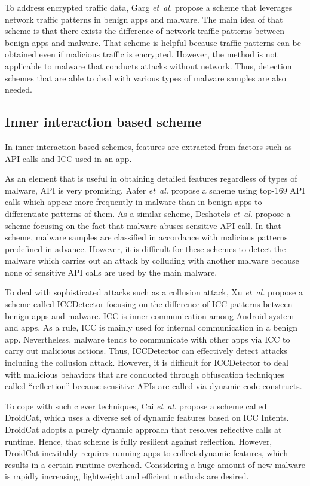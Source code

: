 \documentclass{ieeeaccess}
\newcommand{\etal}{\textit{et~al.}}
\begin{document}
To address encrypted traffic data, Garg \etal \cite{garg2017network} propose a scheme that leverages network traffic patterns in benign apps and malware.
The main idea of that scheme is that there exists the difference of network traffic patterns between benign apps and malware. 
That scheme is helpful because traffic patterns can be obtained even if malicious traffic is encrypted.
However, the method is not applicable to malware that conducts attacks without network.
Thus, detection schemes that are able to deal with various types of malware samples are also needed.

\subsection{Inner interaction based scheme}
In inner interaction based schemes, features are extracted from factors such as API calls and ICC used in an app.

As an element that is useful in obtaining detailed features regardless of types of malware, API is very promising.
Aafer \etal \cite{aafer2013droidapiminer} propose a scheme using top-169 API calls which appear more frequently in malware than in benign apps to differentiate patterns of them.
As a similar scheme, Deshotels \etal \cite{deshotels2014droidlegacy} propose a scheme focusing on the fact that malware abuses sensitive API call.
In that scheme, malware samples are classified in accordance with malicious patterns predefined in advance. 
However, it is difficult for these schemes to detect the malware which carries out an attack by colluding with another malware because none of sensitive API calls are used by the main malware.

To deal with sophisticated attacks such as a collusion attack, Xu \etal \cite{xu2016iccdetector} propose a scheme called ICCDetector focusing on the difference of ICC patterns between benign apps and malware.
ICC is inner communication among Android system and apps.
As a rule, ICC is mainly used for internal communication in a benign app.
Nevertheless, malware tends to communicate with other apps via ICC to carry out malicious actions.
Thus, ICCDetector can effectively detect attacks including the collusion attack.
However, it is difficult for ICCDetector to deal with malicious behaviors that are conducted through obfuscation techniques called ``reflection'' because sensitive APIs are called via dynamic code constructs.

To cope with such clever techniques, Cai \etal \cite{cai2018droidcat} propose a scheme called DroidCat, which uses a diverse set of dynamic features based on ICC Intents.
DroidCat adopts a purely dynamic approach that resolves reflective calls at runtime.
Hence, that scheme is fully resilient against reflection.
However, DroidCat inevitably requires running apps to collect dynamic features, which results in a certain runtime overhead.  
Considering a huge amount of new malware is rapidly increasing, lightweight and efficient methods are desired.
\end{document}
